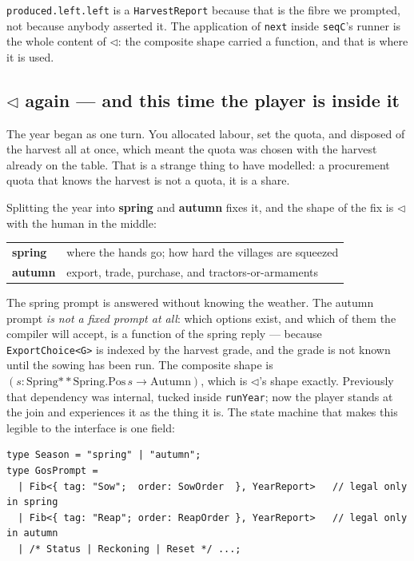 \documentclass[11pt,a4paper]{article}
\begin{document}
\noindent \verb|produced.left.left| is a \verb|HarvestReport| because that is
the fibre we prompted, not because anybody asserted it. The application of
\verb|next| inside \verb|seqC|'s runner is the whole content of $\lhd$: the
composite shape carried a function, and that is where it is used.

\subsection{$\lhd$ again --- and this time the player is inside it}

The year began as one turn. You allocated labour, set the quota, and disposed
of the harvest all at once, which meant the quota was chosen with the harvest
already on the table. That is a strange thing to have modelled: a procurement
quota that knows the harvest is not a quota, it is a share.

Splitting the year into \textbf{spring} and \textbf{autumn} fixes it, and the
shape of the fix is $\lhd$ with the human in the middle:

\begin{center}
\begin{tabular}{ll}
\toprule
\textbf{spring} & where the hands go; how hard the villages are squeezed \\
\textbf{autumn} & export, trade, purchase, and tractors-or-armaments \\
\bottomrule
\end{tabular}
\end{center}

\noindent The spring prompt is answered without knowing the weather. The
autumn prompt \emph{is not a fixed prompt at all}: which options exist, and
which of them the compiler will accept, is a function of the spring reply ---
because \verb|ExportChoice<G>| is indexed by the harvest grade, and the grade
is not known until the sowing has been run. The composite shape is
$(s : \mathrm{Spring} \mathbin{**} \mathrm{Spring.Pos}\,s \to \mathrm{Autumn})$,
which is $\lhd$'s shape exactly. Previously that dependency was internal, tucked
inside \verb|runYear|; now the player stands at the join and experiences it as
the thing it is. The state machine that makes this legible to the interface is
one field:

\begin{lstlisting}[language=TS]
type Season = "spring" | "autumn";
type GosPrompt =
  | Fib<{ tag: "Sow";  order: SowOrder  }, YearReport>   // legal only in spring
  | Fib<{ tag: "Reap"; order: ReapOrder }, YearReport>   // legal only in autumn
  | /* Status | Reckoning | Reset */ ...;
\end{lstlisting}
\end{document}
